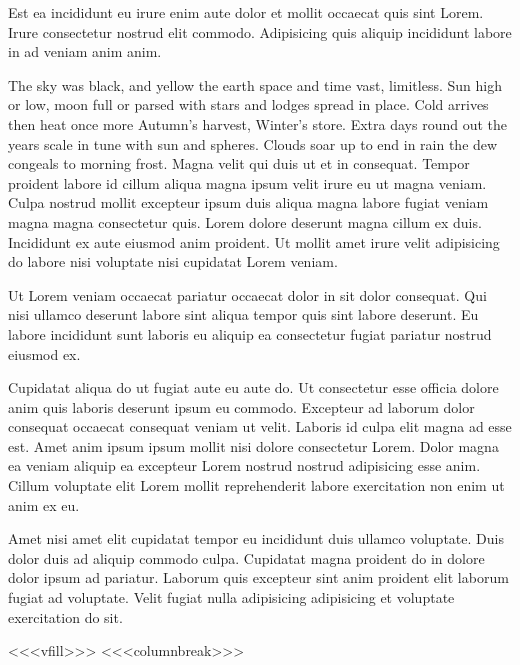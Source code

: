 \vspace{\myLineheight}\begin{multicols}{2}\raggedcolumns{}Est ea incididunt eu irure enim aute dolor et mollit occaecat quis sint Lorem. Irure consectetur nostrud elit commodo. Adipisicing quis aliquip incididunt labore in ad veniam anim anim.



\cjkgGlue{} The sky was black, and yellow the earth
\cjkgGlue{} space and time vast, limitless.
\cjkgGlue{} Sun high or low, moon full or parsed
\cjkgGlue{} with stars and lodges spread in place.
\cjkgGlue{} Cold arrives then heat once more
\cjkgGlue{} Autumn’s harvest, Winter’s store.
\cjkgGlue{} Extra days round out the years
\cjkgGlue{} scale in tune with sun and spheres.
\cjkgGlue{} Clouds soar up to end in rain
\cjkgGlue{} the dew congeals to morning frost.
Magna velit qui duis ut et in consequat. Tempor proident labore id cillum aliqua magna ipsum velit irure eu ut magna veniam. Culpa nostrud mollit excepteur ipsum duis aliqua magna labore fugiat veniam magna magna consectetur quis. Lorem dolore deserunt magna cillum ex duis. Incididunt ex aute eiusmod anim proident. Ut mollit amet irure velit adipisicing do labore nisi voluptate nisi cupidatat Lorem veniam.


Ut Lorem veniam occaecat pariatur occaecat dolor in sit dolor consequat. Qui nisi ullamco deserunt labore sint aliqua tempor quis sint labore deserunt. Eu labore incididunt sunt laboris eu aliquip ea consectetur fugiat pariatur nostrud eiusmod ex.


Cupidatat aliqua do ut fugiat aute eu aute do. Ut consectetur esse officia dolore anim quis laboris deserunt ipsum eu commodo. Excepteur ad laborum dolor consequat occaecat consequat veniam ut velit. Laboris id culpa elit magna ad esse est. Amet anim ipsum ipsum mollit nisi dolore consectetur Lorem. Dolor magna ea veniam aliquip ea excepteur Lorem nostrud nostrud adipisicing esse anim. Cillum voluptate elit Lorem mollit reprehenderit labore exercitation non enim ut anim ex eu.


Amet nisi amet elit cupidatat tempor eu incididunt duis ullamco voluptate. Duis dolor duis ad aliquip commodo culpa. Cupidatat magna proident do in dolore dolor ipsum ad pariatur. Laborum quis excepteur sint anim proident elit laborum fugiat ad voluptate. Velit fugiat nulla adipisicing adipisicing et voluptate exercitation do sit.



<<<vfill>>>
<<<columnbreak>>>


\end{multicols}


